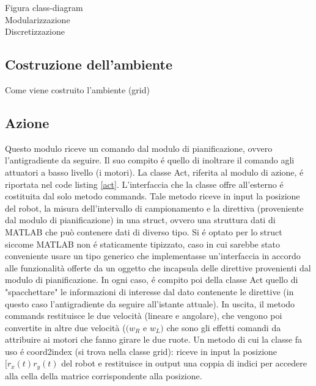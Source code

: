\documentclass[14pt,a4paper]{extarticle}
\begin{document}
Figura class-diagram\\
Modularizzazione \\
Discretizzazione \\

\subsection{Costruzione dell'ambiente}
Come viene costruito l'ambiente (grid)\newpage

\subsection{Azione}
Questo modulo riceve un comando dal modulo di pianificazione, ovvero l'antigradiente da seguire. Il suo compito é quello di inoltrare il comando agli attuatori a basso livello (i motori). La classe Act, riferita al modulo di azione, é riportata nel code listing \ref{act}. L'interfaccia che la classe offre all'esterno é costituita dal solo metodo commands. Tale metodo riceve in input la posizione del robot, la misura dell'intervallo di campionamento e la direttiva (proveniente dal modulo di pianificazione) in una struct, ovvero una struttura dati di MATLAB che può contenere dati di diverso tipo. Si é optato per lo struct siccome MATLAB non é staticamente tipizzato, caso in cui sarebbe stato conveniente usare un tipo generico che implementasse un'interfaccia in accordo alle funzionalità offerte da un oggetto che incapsula delle direttive provenienti dal modulo di pianificazione. In ogni caso, é compito poi della classe Act quello di "spacchettare" le informazioni di interesse dal dato contenente le direttive (in questo caso l'antigradiente da seguire all'istante attuale). In uscita, il metodo commands restituisce le due velocità (lineare e angolare), che vengono poi convertite in altre due velocità (\((w_R\) e \(w_L)\) che sono gli effetti comandi da attribuire ai motori che fanno girare le due ruote. Un metodo di cui la classe fa uso é coord2index (si trova nella classe grid): riceve in input la posizione \([r_x(t) r_y(t)\) del robot e restituisce in output una coppia di indici per accedere alla cella della matrice corrispondente alla posizione.
\end{document}
